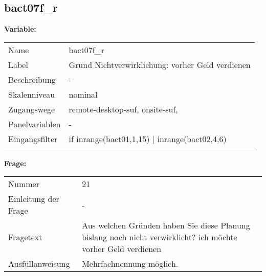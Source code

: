 	
	
	\subsection{bact07f\_r}
	\label{subSection:bact07f_r}

	\noindent\textbf{Variable:}\\
		\begin{tabular}{lL{11.3cm}}
			\label{tableVariable:bact07f_r}
			Name & bact07f\_r \\
			Label & Grund Nichtverwirklichung: vorher Geld verdienen \\
			Beschreibung & - \\
			Skalenniveau & nominal \\
			Zugangswege &
				remote-desktop-suf,
				onsite-suf,
 \\
			Panelvariablen & -
			 \\
			Eingangsfilter & if inrange(bact01,1,15) | inrange(bact02,4,6) \\
 \\
		\end{tabular}

		\vspace*{1 cm}
		\noindent\textbf{Frage:}\\
		\begin{tabular}{lL{11.3cm}}
			\label{tableQuestion:bact07f_r}
			Nummer & 21 \\
			Einleitung der Frage & - \\
			Fragetext & Aus welchen Gründen haben Sie diese Planung bislang noch nicht verwirklicht?
ich möchte vorher Geld verdienen \\
			Ausfüllanweisung & Mehrfachnennung möglich. \\
		\end{tabular}





